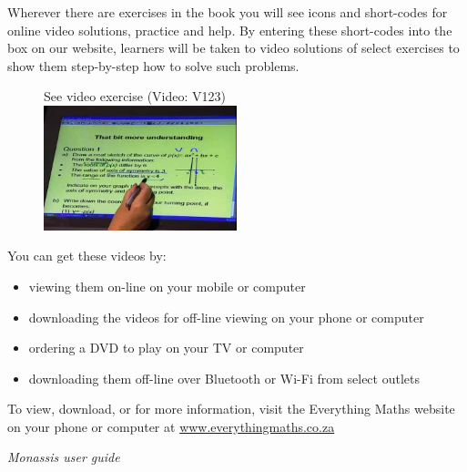 {\Large

Wherever there are exercises in the book you will see icons and short-codes for online video solutions,
practice and help. By entering these short-codes into the box on our website, learners will be taken to video solutions of select exercises to show them
step-by-step how to solve such problems. \par

\begin{figure}[h]
\begin{center}
See video exercise  (Video: V123)\\ 
\includegraphics[width=0.5\textwidth]{../title_images/mindsetexercise.png}
\end{center}
\end{figure}
You can get these videos by:
\begin{itemize}[noitemsep]
    \item viewing them on-line on your mobile or computer
    \item downloading the videos for off-line viewing on your phone or computer
    \item ordering a DVD to play on your TV or computer
    \item downloading them off-line over Bluetooth or Wi-Fi from select outlets
\end{itemize}


To view, download, or for more information, visit the Everything Maths website on your phone or
computer at \underline{www.everythingmaths.co.za}  \par
\vspace*{1cm}
}



{\normalfont\sffamily\fontsize{22}\normalfont\itshape Monassis user guide} \par

